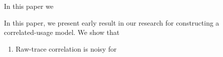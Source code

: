 In this paper we 

In this paper, we present early result in our research for constructing a correlated-usage model.  We show that

\begin{enumerate}
\item Raw-trace correlation is noisy for 
\end{enumerate}










